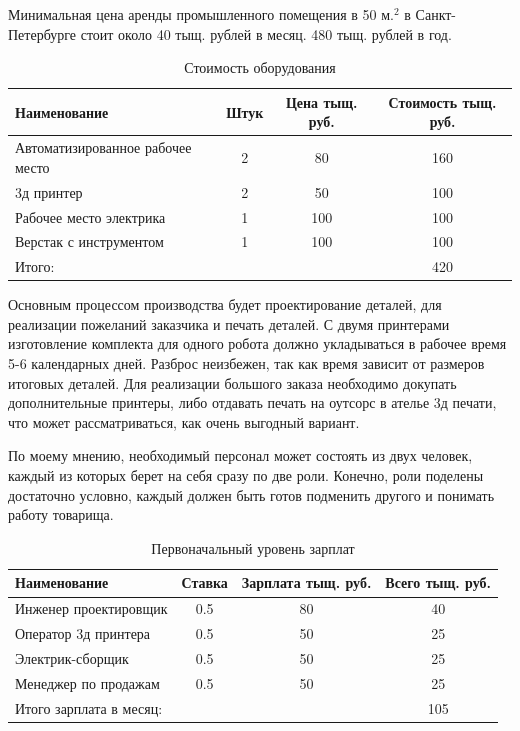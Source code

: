 Минимальная цена аренды промышленного помещения в 50 м.$^{2}$ в Санкт-Петербурге стоит около 40 тыщ. рублей в месяц. 480 тыщ. рублей в год.
\begin{table}[h!]
\centering
\begin{tabular}{|l|c|c|c|}
    \hline
    Наименование & Штук & Цена тыщ. руб.  & Стоимость тыщ. руб. \\
    \hline
    Автоматизированное рабочее место & 2 & 80  & 160 \\
    \hline
    3д принтер & 2 & 50  & 100 \\
    \hline
    Рабочее место электрика & 1 & 100 & 100 \\
    \hline
    Верстак с инструментом & 1 & 100 & 100 \\
    \hline
    Итого: &&& 420 \\
    \hline
\end{tabular}
\caption{Стоимость оборудования}
\end{table}

Основным процессом производства будет проектирование деталей, для реализации пожеланий заказчика и печать деталей. С двумя принтерами изготовление комплекта для одного робота должно укладываться в рабочее время 5-6 календарных дней. Разброс неизбежен, так как время зависит от размеров итоговых деталей. Для реализации большого заказа необходимо докупать дополнительные принтеры, либо отдавать печать на оутсорс в ателье 3д печати, что может рассматриваться, как очень выгодный вариант.

По моему мнению, необходимый персонал может состоять из двух человек, каждый из которых берет на себя сразу по две роли. Конечно, роли поделены достаточно условно, каждый должен быть готов подменить другого и понимать работу товарища.  

\begin{table}[h!]
\centering
\begin{tabular}{|l|c|c|c|}
    \hline
    Наименование & Ставка & Зарплата тыщ. руб.& Всего тыщ. руб. \\
    \hline
    Инженер проектировщик & 0.5 & 80  & 40 \\
    \hline
    Оператор 3д принтера & 0.5 & 50  & 25 \\
    \hline
    Электрик-сборщик & 0.5 & 50 & 25 \\
    \hline
    Менеджер по продажам & 0.5 & 50 & 25 \\
    \hline
    Итого зарплата в месяц: &&& 105 \\
    \hline
\end{tabular}
\caption{Первоначальный уровень зарплат}
\end{table}


